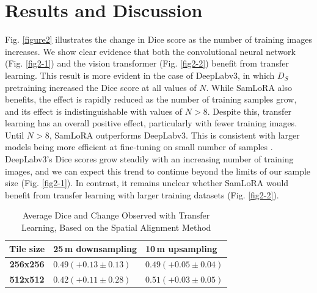 \documentclass[lettersize,journal]{IEEEtran}
\begin{document}
\section{Results and Discussion} 
Fig. \ref{figure2} illustrates the change in Dice score as the number of training images increases. We show clear evidence that both the convolutional neural network (Fig. \ref{fig2-1}) 
and the vision transformer (Fig. \ref{fig2-2}) benefit from transfer learning. This result is more evident in the case of DeepLabv3, in which $\mathit{D}_S$ pretraining increased the Dice score at all values of \( N \).
While SamLoRA also benefits, the effect is rapidly reduced as the number of training samples grow, and its effect is indistinguishable with values of \( N > 8 \). Despite this, transfer learning has an overall positive effect, 
particularly with fewer training images. Until \( N > 8 \), SamLoRA outperforms DeepLabv3. This is consistent with larger models being more efficient at fine-tuning on small number of samples \cite{zhaiScalingVisionTransformers2022}. 
DeepLabv3's Dice scores grow steadily with an increasing number of training images, and we can expect this trend to continue beyond the limits of our sample size (Fig. \ref{fig2-1}). In contrast, it remains unclear whether SamLoRA 
would benefit from transfer learning with larger training datasets (Fig. \ref{fig2-2}).
\begin{table}[t]
    \caption{Average Dice and Change Observed with Transfer Learning, Based on the Spatial Alignment Method\label{table2}}
    \centering
    \begin{tabular}{c>{\centering\arraybackslash}m{3cm}>{\centering\arraybackslash}m{2.6cm}}
    \toprule
    \textbf{Tile size} & \textbf{25\,m downsampling} & \textbf{10\,m upsampling} \\
    \midrule
    \textbf{256x256} & $0.49 (+0.13 \pm 0.13)$ & $0.49 (+0.05 \pm 0.04)$ \\
    \textbf{512x512} & $0.42 (+0.11 \pm 0.28)$ & $0.51 (+0.03 \pm 0.05)$ \\
    \bottomrule
    \end{tabular}
\end{table}
\end{document}
